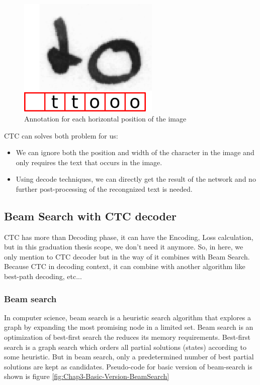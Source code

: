           \begin{figure}[H]
            \centering
            \includegraphics[width=0.6\textwidth]{img/Chap3/Annotation-image-CTC}
            \caption{ Annotation for each horizontal position of the image }
            \label{fig:Chap3-Annottion-image-CTC}
          \end{figure}
        CTC can solves both problem for us:
        \begin{itemize}
          \item We can ignore both the position and width of the character in the image
          and only requires the text that occurs in the image.
          \item Using decode techniques, we can directly get the result of the network and
          no further post-processing of the recongnized text is needed. 
        \end{itemize}

    \subsection{ Beam Search with CTC decoder }
      CTC has more than Decoding phase, it can have the Encoding, Loss calculation, but in
      this graduation thesis scope, we don't need it anymore. So, in here, we only
      mention to CTC decoder but in the way of it combines with Beam Search. Because CTC
      in decoding context, it can combine with another algorithm like best-path decoding, etc...

      \subsubsection{ Beam search }
      In computer science, beam search is a heuristic search algorithm that
      explores a graph by expanding the most promising node in a limited set.
      Beam search is an optimization of best-first search the reduces its memory
      requirements. Best-first search is a graph search which orders all
      partial solutions (states) according to some heuristic. But in beam search,
      only a predetermined number of best partial solutions are kept as candidates.
      Pseudo-code for basic version of beam-search is shown is figure \ref{fig:Chap3-Basic-Version-BeamSearch}

